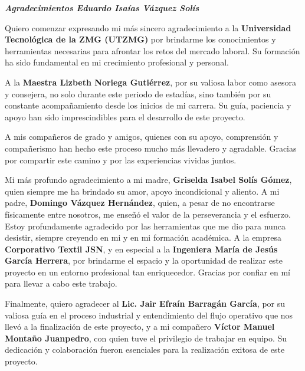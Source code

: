 \documentclass[12pt,letterpaper,spanish]{report}
\newenvironment{dedication}{\newpage\large\null\em\vskip1in}%
{\vfill}
\begin{document}
\newpage
\begin{dedication}
    \textbf{Agradecimientos Eduardo Isaías Vázquez Solís}
 
 
 
  Quiero comenzar expresando mi más sincero agradecimiento a la \textbf{Universidad Tecnológica de la ZMG (UTZMG)} por brindarme los conocimientos y herramientas necesarias para afrontar los retos del mercado laboral. Su formación ha sido fundamental en mi crecimiento profesional y personal.

    A la \textbf{Maestra Lizbeth Noriega Gutiérrez}, por su valiosa labor como asesora y consejera, no solo durante este periodo de estadías, sino también por su constante acompañamiento desde los inicios de mi carrera. Su guía, paciencia y apoyo han sido imprescindibles para el desarrollo de este proyecto.
    
    A mis compañeros de grado y amigos, quienes con su apoyo, comprensión y compañerismo han hecho este proceso mucho más llevadero y agradable. Gracias por compartir este camino y por las experiencias vividas juntos.

    Mi más profundo agradecimiento a mi madre, \textbf{Griselda Isabel Solís Gómez}, quien siempre me ha brindado su amor, apoyo incondicional y aliento. A mi padre, \textbf{Domingo Vázquez Hernández}, quien, a pesar de no encontrarse físicamente entre nosotros, me enseñó el valor de la perseverancia y el esfuerzo. Estoy profundamente agradecido por las herramientas que me dio para nunca desistir, siempre creyendo en mi y en mi formación académica.
    \newpage
    A la empresa \textbf{Corporativo Textil JSN}, y en especial a la \textbf{Ingeniera María de Jesús García Herrera}, por brindarme el espacio y la oportunidad de realizar este proyecto en un entorno profesional tan enriquecedor. Gracias por confiar en mí para llevar a cabo este trabajo.

    Finalmente, quiero agradecer al \textbf{Lic. Jair Efraín Barragán García}, por su valiosa guía en el proceso industrial y entendimiento del flujo operativo que nos llevó a la finalización de este proyecto, y a mi compañero \textbf{Víctor Manuel Montaño Juanpedro}, con quien tuve el privilegio de trabajar en equipo. Su dedicación y colaboración fueron esenciales para la realización exitosa de este proyecto.
\end{dedication}



\tableofcontents
\end{document}

